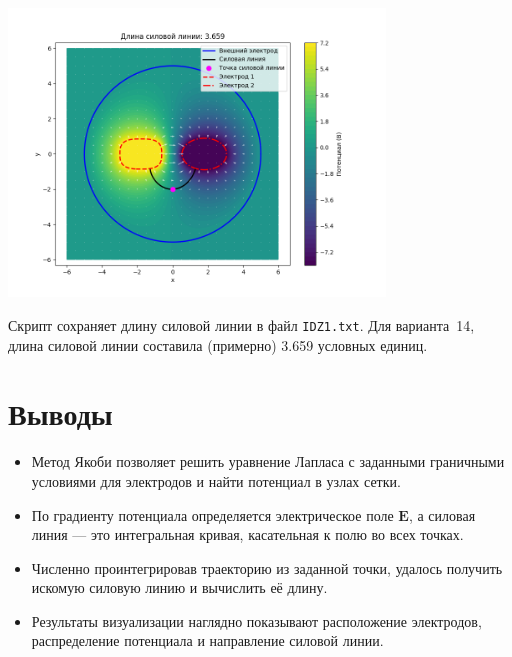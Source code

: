 \documentclass[12pt]{article}
\begin{document}
\vspace{-1cm}
\begin{center}
    \includegraphics[width=0.75\textwidth]{pictures/result.png}
\end{center}

Скрипт сохраняет длину силовой линии в файл \texttt{IDZ1.txt}. Для варианта~14, длина силовой линии составила (примерно) 3.659 условных единиц.

\section*{Выводы}

\begin{itemize}
    \item Метод Якоби позволяет решить уравнение Лапласа с заданными граничными условиями для электродов и найти потенциал в узлах сетки.
    \item По градиенту потенциала определяется электрическое поле \(\mathbf{E}\), а силовая линия --- это интегральная кривая, касательная к полю во всех точках.
    \item Численно проинтегрировав траекторию из заданной точки, удалось получить искомую силовую линию и вычислить её длину.
    \item Результаты визуализации наглядно показывают расположение электродов, распределение потенциала и направление силовой линии.
\end{itemize}
\end{document}
